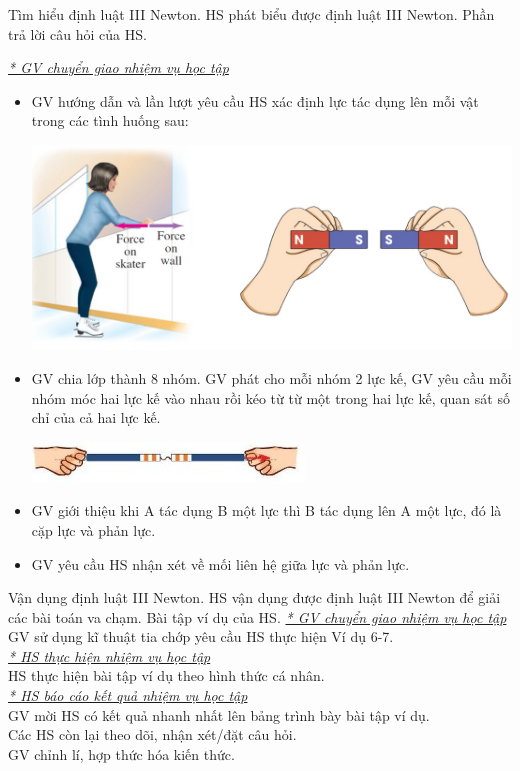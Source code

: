 \hoatdong
{Tìm hiểu định luật III Newton.
}
{HS phát biểu được định luật III Newton.
}
{Phần trả lời câu hỏi của HS.
}
{\textit{\underline{* GV chuyển giao nhiệm vụ học tập}}\\
	\begin{itemize}[label=-]
		\item GV hướng dẫn và lần lượt yêu cầu HS xác định lực tác dụng lên mỗi vật trong các tình huống sau:
		\begin{center}
			\includegraphics[scale=0.4]{figs/G10-BAI10-10}
		\end{center}
		\item GV chia lớp thành 8 nhóm. GV phát cho mỗi nhóm 2 lực kế, GV yêu cầu mỗi nhóm móc hai lực kế vào nhau rồi kéo từ từ một trong hai lực kế, quan sát số chỉ của cả hai lực kế. 
		\begin{center}
			\includegraphics{figs/G10-BAI10-11}
		\end{center}
		\item GV giới thiệu khi A tác dụng B một lực thì B tác dụng lên A một lực, đó là cặp lực và phản lực.
		\item GV yêu cầu HS nhận xét về mối liên hệ giữa lực và phản lực.
	\end{itemize}
}
\hoatdong
{Vận dụng định luật III Newton.
}
{HS vận dụng được định luật III Newton để giải các bài toán va chạm.
}
{Bài tập ví dụ của HS.
}
{\textit{\underline{* GV chuyển giao nhiệm vụ học tập}}\\
	GV sử dụng kĩ thuật tia chớp yêu cầu HS thực hiện Ví dụ 6-7.\\
	\textit{\underline{* HS thực hiện nhiệm vụ học tập}}\\
	HS thực hiện bài tập ví dụ theo hình thức cá nhân.\\
	\textit{\underline{* HS báo cáo kết quả nhiệm vụ học tập}}\\
	GV mời HS có kết quả nhanh nhất lên bảng trình bày bài tập ví dụ.\\
	Các HS còn lại theo dõi, nhận xét/đặt câu hỏi.\\
	GV chỉnh lí, hợp thức hóa kiến thức.
}

